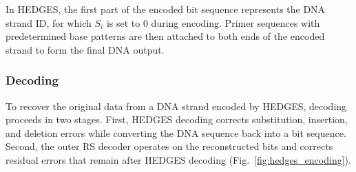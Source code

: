 \documentclass[sotsuron]{kuee}
\begin{document}

In HEDGES, the first part of the encoded bit sequence represents the DNA strand ID,
for which $S_i$ is set to 0 during encoding.
Primer sequences with predetermined base patterns are then attached to both ends of the encoded strand
to form the final DNA output.

\subsubsection{Decoding} \label{hedges_decoding}
To recover the original data from a DNA strand encoded by HEDGES, decoding proceeds in two stages.
First, HEDGES decoding corrects substitution, insertion, and deletion errors while converting the DNA
sequence back into a bit sequence.
Second, the outer RS decoder operates on the reconstructed bits and corrects residual errors that remain
after HEDGES decoding (Fig.~\ref{fig:hedges_encoding}).
\end{document}
